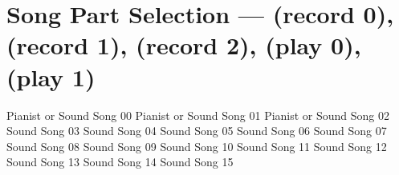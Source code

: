 \section{Song Part Selection ---  (record 0),  (record 1),  (record 2),  (play 0),  (play 1)}
Pianist or Sound Song 00
Pianist or Sound Song 01
Pianist or Sound Song 02
Sound Song 03
Sound Song 04
Sound Song 05
Sound Song 06
Sound Song 07
Sound Song 08
Sound Song 09
Sound Song 10
Sound Song 11
Sound Song 12
Sound Song 13
Sound Song 14
Sound Song 15
